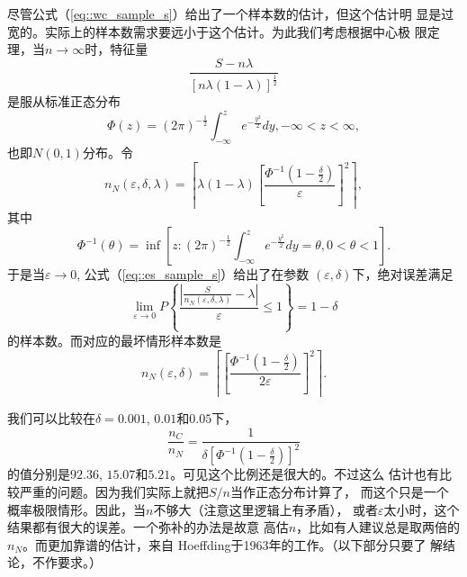 尽管公式（\ref{eq::wc_sample_s}）给出了一个样本数的估计，但这个估计明
显是过宽的。实际上的样本数需求要远小于这个估计。为此我们考虑根据中心极
限定理，当$n \to \infty$时，特征量
$$
\frac{S - n \lambda}{[n \lambda (1 -
  \lambda)]^{\frac{1}{2}}}
$$
是服从标准正态分布
\begin{equation}
  \Phi(z) = (2 \pi)^{-\frac{1}{2}}\int_{-\infty}^z e^{-\frac{y^2}{2}} dy, -\infty < z < \infty,
  \label{eq::cdf_std_normal}
\end{equation}
也即$N(0, 1)$分布。令
\begin{equation}
  n_N(\varepsilon, \delta, \lambda) = \left\lceil \lambda (1 -
  \lambda) \left[\frac{\Phi^{-1}(1 -
      \frac{\delta}{2})}{\varepsilon}\right]^2\right\rceil,
  \label{eq::es_sample_s}
\end{equation}
其中
\begin{equation}
  \Phi^{-1}(\theta) = \inf\left[z : (2 \pi)^{-\frac{1}{2}}
    \int_{-\infty}^z e^{-\frac{y^2}{2}} dy = \theta, 0 < \theta < 1\right].
\end{equation}
于是当$\varepsilon \to 0$, 公式（\ref{eq::es_sample_s}）给出了在参数
$(\varepsilon, \delta)$下，绝对误差满足
\begin{equation}
  \lim_{\varepsilon \to 0} P\left\{\frac{\left|\frac{S}{n_N(\varepsilon,
      \delta, \lambda)} - \lambda\right|}{\varepsilon} \leq 1\right\} = 1 - \delta
  \label{eq::es_pro_abs_error}
\end{equation}
的样本数。而对应的最坏情形样本数是
\begin{equation}
  n_N(\varepsilon, \delta) = \left\lceil \left[\frac{\Phi^{-1}(1 -
      \frac{\delta}{2})}{2\varepsilon}\right]^2\right\rceil.
  \label{eq::es_worst_sample_s}
\end{equation}

我们可以比较在$\delta = 0.001$, $0.01$和$0.05$下，
$$
\frac{n_C}{n_N} = \frac{1}{\delta\left[\Phi^{-1}(1 - \frac{\delta}{2})\right]^2}
$$的值分别是$92.36$, $15.07$和$5.21$。可见这个比例还是很大的。不过这么
估计也有比较严重的问题。因为我们实际上就把$S / n$当作正态分布计算了，
而这个只是一个概率极限情形。因此，当$n$不够大（注意这里逻辑上有矛盾），
或者$\varepsilon$太小时，这个结果都有很大的误差。一个弥补的办法是故意
高估$n$，比如有人建议总是取两倍的$n_N$。而更加靠谱的估计，来自
Hoeffding于1963年的工作\cite{Wassily1963Probability}。（以下部分只要了
  解结论，不作要求。）


